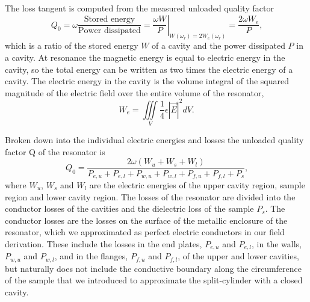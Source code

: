 The loss tangent is computed from the measured unloaded quality factor
\begin{equation}
Q_0=\omega\frac{\text{Stored energy}}{\text{Power dissipated}}=\left.\frac{\omega W}{P}\right\vert_{W(\omega_r)=2W_e(\omega_r)}=\frac{2\omega W_e}{P}\text{,}
\end{equation}
which is a ratio of the stored energy $W$ of a cavity and the power dissipated $P$ in a cavity. At resonance the magnetic energy is equal to electric energy in the cavity, so the total energy can be written as two times the electric energy of a cavity. The electric energy in the cavity is the volume integral of the squared magnitude of the electric field over the entire volume of the resonator,
\begin{equation}\label{eq:energy}
W_e=\iiint\limits_{\mathit{V}}\frac{1}{4}\epsilon|\vec{E}|^2\mathit{dV}\text{.}
\end{equation}

Broken down into the individual electric energies and losses the unloaded quality factor Q of the resonator is
\begin{equation}
Q_0=\frac{2\omega(W_u+W_s+W_l)}{P_{e,u}+P_{e,l}+P_{w,u}+P_{w,l}+P_{f,u}+P_{f,l}+P_s}\text{,}
\end{equation}
where $W_u$, $W_s$ and $W_l$ are the electric energies of the upper cavity region, sample region and lower cavity region. The losses of the resonator are divided into the conductor losses of the cavities and the dielectric loss of the sample $P_s$. The conductor losses are the losses on the surface of the metallic enclosure of the resonator, which we approximated as perfect electric conductors in our field derivation. These include the losses in the end plates, $P_{e,u}$ and $P_{e,l}$, in the walls, $P_{w,u}$ and $P_{w,l}$, and in the flanges, $P_{f,u}$ and $P_{f,l}$, of the upper and lower cavities, but naturally does not include the conductive boundary along the circumference of the sample that we introduced to approximate the split-cylinder with a closed cavity.

